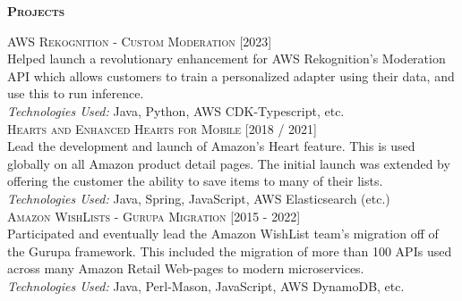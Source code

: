 \documentclass[letterpaper,12pt,final]{memoir}
\newcommand{\Sep}{\vspace{1.5em}}
\newcommand{\SmallSep}{\vspace{0.5em}}
\newcommand{\CVSection}[1]
	{\Large\textbf{\textsc{{#1}}}\par
	\SmallSep\normalsize\normalfont}
\newcommand{\CVItem}[1]
	{\textsc{\color{Plum} #1}}
\newcommand{\RightAlignedInlineText}[1]
{{\footnotesize \color{Plum}  \hfill [#1]}}
\begin{document}
\CVSection{Projects}
\CVItem{AWS Rekognition - Custom Moderation}  \RightAlignedInlineText{2023}\\
{\footnotesize Helped launch a revolutionary enhancement for AWS Rekognition's Moderation API which allows customers to train a personalized adapter using their data, and use this to run inference.\\
	\emph{Technologies Used:} Java, Python, AWS CDK-Typescript, etc. }%
\SmallSep\\
\CVItem{Hearts and Enhanced Hearts for Mobile} \RightAlignedInlineText{2018 / 2021}\\
{\footnotesize Lead the development and launch of Amazon's Heart feature. This is used globally  on all Amazon product detail pages. The initial launch was extended by offering the customer the ability to save items to many of their lists.\\\color{Black}
\emph{Technologies Used:} Java, Spring, JavaScript, AWS Elasticsearch (etc.)}%
\SmallSep\\
\CVItem{Amazon WishLists - Gurupa Migration} \RightAlignedInlineText{2015 - 2022}\\
{\footnotesize Participated and eventually lead the Amazon WishList team's migration off of the Gurupa framework. This included the migration of more than 100 APIs used across many Amazon Retail Web-pages to modern microservices.\\\color{Black}
	\emph{Technologies Used:} Java, Perl-Mason, JavaScript, AWS DynamoDB, etc.}%
\SmallSep\\
\end{document}
